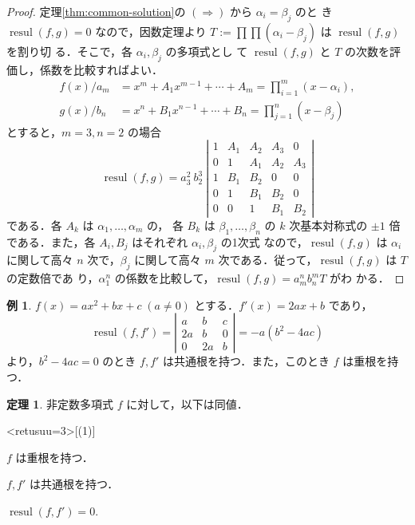 \documentclass[12pt, uplatex, dvipdfmx]{jsarticle}
\theoremstyle{definition}
\newtheorem{theorem}{定理}
\newtheorem{example}{例}
\DeclareMathOperator{\resul}{resul}
\begin{document}
\begin{proof}
  定理\ref{thm:common-solution}の $(\Rightarrow)$ から $\alpha_i=\beta_j$ のと
  き $\resul(f,g)=0$ なので，因数定理より $T:=\prod \prod (\alpha_i-\beta_j)$ は $\resul(f,g)$ を割り切
  る．そこで，各 $\alpha_i, \beta_j$ の多項式とし
  て $\resul(f,g)$ と $T$ の次数を評価し，係数を比較すればよい．
  \[
    \begin{aligned}
      f(x)/a_m &= x^m + A_{1} x^{m-1} + \cdots + A_m = \prod_{i=1}^{m}(x-\alpha_i),\\
      g(x)/b_n &= x^n + B_{1} x^{n-1} + \cdots + B_n = \prod_{j=1}^{n}(x-\beta_j)
    \end{aligned}
  \]
  とすると，$m=3, n=2$ の場合
  \[
    \resul(f,g) = a_3^2\ b_2^3\ \left|
      \begin{array}{ccccc}
        1 & A_1 & A_2  & A_3 & 0\\
        0 & 1 & A_1 & A_2 & A_3\\
        1 & B_1 & B_2 & 0 & 0 \\
        0 & 1 & B_1 & B_2 & 0\\
        0 & 0 & 1 & B_1 & B_2
      \end{array}
    \right|
  \]
  である．各 $A_k$ は $\alpha_1, \ldots, \alpha_m$ の，
  各 $B_k$ は $\beta_1, \ldots, \beta_n$ の $k$ 次基本対称式の $\pm 1$
  倍である．また，各 $A_i, B_j$ はそれぞれ $\alpha_i, \beta_j$ の1次式
  なので，$\resul(f,g)$ は $\alpha_i$ に関して高々 $n$ 次で，$\beta_j$
  に関して高々 $m$ 次である．従って，$\resul(f,g)$ は $T$ の定数倍であ
  り，$\alpha_1^n$ の係数を比較して，$\resul(f,g) = a_m^n b_n^m T$ がわ
  かる．
\end{proof}

\begin{example}\label{exmp:disc2}
  $f(x) = ax^2+bx+c \; (a \neq 0)$ とする．$f'(x) = 2ax + b$ であり，
  \[
    \resul(f, f') = \left|
      \begin{array}{ccc}
        a & b & c\\
        2a & b & 0\\
        0 & 2a & b
      \end{array}
    \right| =-a (b^2-4ac)
  \]
  より，$b^2-4ac=0$ のとき $f, f'$ は共通根を持つ．また，このとき $f$ は重根を持つ．
\end{example}

\begin{theorem}\label{thm:double-resul}
  非定数多項式 $f$ に対して，以下は同値．
  \begin{edaenumerate}<retusuu=3>[(1)]
  \item $f$ は重根を持つ．
  \item $f, f'$ は共通根を持つ．
  \item $\resul(f, f')=0$.
  \end{edaenumerate}
\end{theorem}
\end{document}
